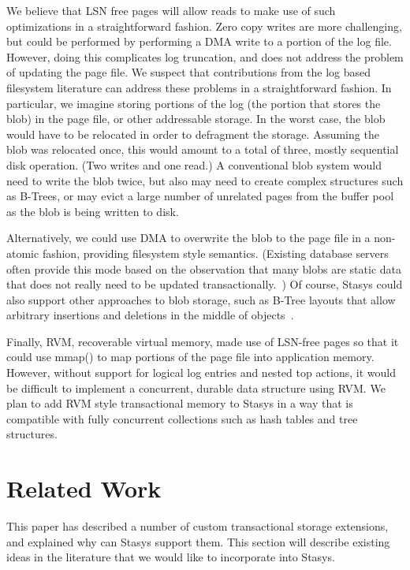 \documentclass[letterpaper,twocolumn,10pt]{article}
\newcommand{\yad}{Stasys\xspace}
\begin{document}
We believe that LSN free pages will allow reads to make use of such
optimizations in a straightforward fashion.  Zero copy writes are more challenging, but could be
performed by performing a DMA write to a portion of the log file.
However, doing this complicates log truncation, and does not address
the problem of updating the page file.  We suspect that contributions
from the log based filesystem literature can address these problems in
a straightforward fashion.  In particular, we imagine storing 
portions of the log (the portion that stores the blob) in the 
page file, or other addressable storage.  In the worst case, 
the blob would have to be relocated in order to defragment the 
storage.  Assuming the blob was relocated once, this would amount 
to a total of three, mostly sequential disk operation.  (Two 
writes and one read.)  A conventional blob system would need 
to write the blob twice, but also may need to create complex 
structures such as B-Trees, or may evict a large number of 
unrelated pages from the buffer pool as the blob is being written 
to disk.  

Alternatively, we could use DMA to overwrite the blob to the page file
in a non-atomic fashion, providing filesystem style semantics.
(Existing database servers often provide this mode based on the
observation that many blobs are static data that does not really need
to be updated transactionally.~\cite{sqlserver}) Of course, \yad could
also support other approaches to blob storage, such as B-Tree layouts
that allow arbitrary insertions and deletions in the middle of
objects~\cite{esm}.

Finally, RVM, recoverable virtual memory, made use of LSN-free pages
so that it could use mmap() to map portions of the page file into
application memory.\cite{rvm}  However, without support for logical log entries
and nested top actions, it would be difficult to implement a
concurrent, durable data structure using RVM.  We plan to add RVM
style transactional memory to \yad in a way that is compatible with
fully concurrent collections such as hash tables and tree structures.


\section{Related Work}

This paper has described a number of custom transactional storage
extensions, and explained why can \yad support them.  This section
will describe existing ideas in the literature that we would like to
incorporate into \yad.
\end{document}
